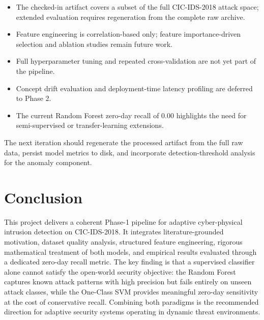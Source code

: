 \documentclass[10pt,conference]{IEEEtran}
\begin{document}
\begin{itemize}[leftmargin=*,noitemsep]
  \item The checked-in artifact covers a subset of the full
        CIC-IDS-2018 attack space; extended evaluation requires
        regeneration from the complete raw archive.
  \item Feature engineering is correlation-based only; feature
        importance-driven selection and ablation studies remain future work.
  \item Full hyperparameter tuning and repeated cross-validation are
        not yet part of the pipeline.
  \item Concept drift evaluation and deployment-time latency profiling
        are deferred to Phase 2.
  \item The current Random Forest zero-day recall of 0.00 highlights
        the need for semi-supervised or transfer-learning extensions.
\end{itemize}

The next iteration should regenerate the processed artifact from the
full raw data, persist model metrics to disk, and incorporate
detection-threshold analysis for the anomaly component.

\section{Conclusion}
\label{sec:conclusion}

This project delivers a coherent Phase-1 pipeline for adaptive
cyber-physical intrusion detection on CIC-IDS-2018. It integrates
literature-grounded motivation, dataset quality analysis, structured
feature engineering, rigorous mathematical treatment of both models,
and empirical results evaluated through a dedicated zero-day recall
metric. The key finding is that a supervised classifier alone cannot
satisfy the open-world security objective: the Random Forest captures
known attack patterns with high precision but fails entirely on unseen
attack classes, while the One-Class SVM provides meaningful zero-day
sensitivity at the cost of conservative recall. Combining both
paradigms is the recommended direction for adaptive security systems
operating in dynamic threat environments.

\balance


\end{document}
